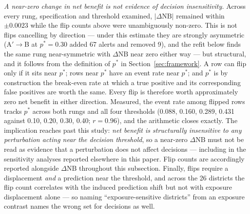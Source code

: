 \documentclass[11pt,a4paper]{article}
\begin{document}
\emph{A near-zero change in net benefit is not evidence of decision insensitivity.} Across every rung, specification and threshold examined, $|\Delta\mathrm{NB}|$ remained within $\pm0.0023$ while the flip counts above were unambiguously non-zero. This is not flips cancelling by direction --- under this estimate they are strongly asymmetric (A$'\to$B at $p^*=0.30$ added 67 alerts and removed 9), and the refit below finds the same rung near-symmetric with $\Delta\mathrm{NB}$ near zero either way --- but structural, and it follows from the definition of $p^*$ in Section~\ref{sec:framework}. A row can flip only if it sits near $p^*$; rows near $p^*$ have an event rate near $p^*$; and $p^*$ is by construction the break-even rate at which a true positive and its corresponding false positives are worth the same. Every flip is therefore worth approximately zero net benefit in either direction. Measured, the event rate among flipped rows tracks $p^*$ across both rungs and all four thresholds (0.088, 0.160, 0.289, 0.431 against 0.10, 0.20, 0.30, 0.40; $r=0.96$), and the arithmetic closes exactly. The implication reaches past this study: \emph{net benefit is structurally insensitive to any perturbation acting near the decision threshold}, so a near-zero $\Delta\mathrm{NB}$ must not be read as evidence that a perturbation does not affect decisions --- including in the sensitivity analyses reported elsewhere in this paper. Flip counts are accordingly reported alongside $\Delta\mathrm{NB}$ throughout this subsection. Finally, flips require a displacement \emph{and} a prediction near the threshold, and across the 26 districts the flip count correlates with the induced prediction shift but not with exposure displacement alone --- so naming ``exposure-sensitive districts'' from an exposure contrast names the wrong set for decisions as well.
\end{document}
